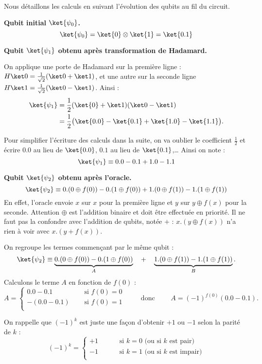 \documentclass[11pt,class=report,crop=false]{standalone}
\begin{document}
Nous détaillons les calculs en suivant l'évolution des qubits au fil du circuit.

\textbf{Qubit initial $\ket{\psi_0}$.}
$$\ket{\psi_0} = \ket{0} \otimes \ket{1} = \ket{0.1}$$

\textbf{Qubit $\ket{\psi_1}$ obtenu après transformation de Hadamard.}

On applique une porte de Hadamard sur la première ligne : $H\ket0 = \frac1{\sqrt2}(\ket0+\ket1)$, et une autre sur la seconde ligne $H\ket1 = \frac1{\sqrt2}(\ket0-\ket1)$.
Ainsi :
\begin{align*}
\ket{\psi_1} 
  &= \frac12(\ket{0}+\ket1)(\ket0-\ket1) \\
  &= \frac12\big( \ket{0.0} - \ket{0.1} + \ket{1.0} - \ket{1.1} \big).
\end{align*}

Pour simplifier l'écriture des calculs dans la suite, on va \og{}oublier\fg{} le coefficient $\frac12$ et écrire $0.0$ au lieu de $\ket{0.0}$, $0.1$ au lieu de $\ket{0.1}$,\ldots{}
Ainsi on note :
$$\ket{\psi_1} \equiv 0.0 - 0.1 +1.0 -1.1$$

\textbf{Qubit $\ket{\psi_2}$ obtenu après l'oracle.}
$$\ket{\psi_2} \equiv 0.(0\oplus f(0)) - 0.(1 \oplus f(0)) +1.(0 \oplus f(1)) -1.(1 \oplus f(1))$$
En effet, l'oracle envoie $x$ sur $x$ pour la première ligne et $y$ sur $y\oplus f(x)$ pour la seconde.
Attention \og{}$\oplus$\fg{} est l'addition binaire et doit être effectuée en priorité. Il ne faut pas la confondre avec l'addition de qubits, notée \og{}$+$\fg{} : $x.(y \oplus f(x))$ n'a rien à voir avec $x.(y+f(x))$.

On regroupe les termes commençant par le même qubit :
$$\ket{\psi_2} \equiv \underbrace{0.(0\oplus f(0)) - 0.(1 \oplus f(0))}_{A} \quad + \quad \underbrace{1.(0 \oplus f(1)) -1.(1 \oplus f(1))}_{B}.$$
Calculons le terme $A$ en fonction de $f(0)$ :
$$A=\left\{ 
\begin{array}{ll}
0.0-0.1 & \quad \text{ si } f(0)=0 \\
-(0.0-0.1) & \quad \text{ si } f(0)=1 \\
\end{array}\right.
\qquad \text{ donc } \qquad 
A = (-1)^{f(0)} (0.0 -0.1).$$

On rappelle que $(-1)^k$ est juste une façon d'obtenir $+1$ ou $-1$ selon la parité de $k$ :
$$(-1)^k=\left\{ 
\begin{array}{ll}
+1 & \qquad \text{ si $k=0$ (ou si $k$ est pair)} \\
-1 & \qquad \text{ si $k=1$ (ou si $k$ est impair)} \\
\end{array}\right.$$
\end{document}
